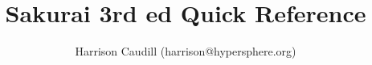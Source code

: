 \documentclass[fleqn]{book}
\title{Sakurai 3rd ed Quick Reference}
\author{Harrison Caudill (harrison@hypersphere.org)}
\date{}
\begin{document}
\maketitle


\graphicspath{{\buildPath/\bookName}}


\end{document}
